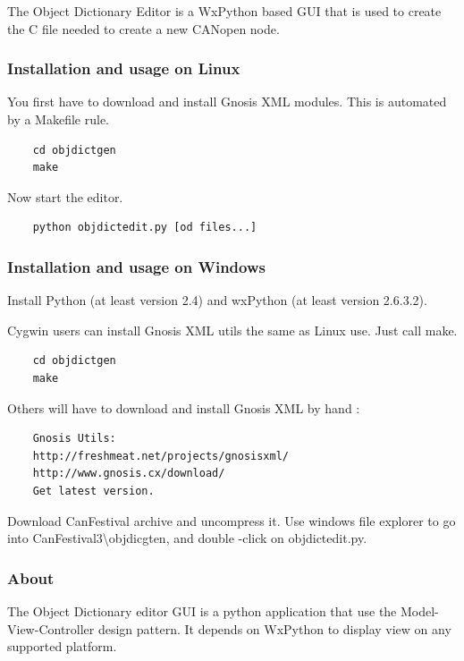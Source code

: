 \documentclass[12pt,english,a4paper]{book}
\newcommand{\canopen}{CANopen }
\begin{document}
The Object Dictionary Editor is a WxPython based GUI that is used
to create the C file needed to create a new \canopen node.


\subsubsection{Installation and usage on Linux}

You first have to download and install Gnosis XML modules. This is
automated by a Makefile rule.

\begin{verbatim}
	cd objdictgen 
	make
\end{verbatim}

Now start the editor.

\begin{verbatim}
	python objdictedit.py [od files...]
\end{verbatim}


\subsubsection{Installation and usage on Windows}

Install Python (at least version 2.4) and wxPython (at least version
2.6.3.2).

Cygwin users can install Gnosis XML utils the same as Linux use. Just
call make.

\begin{verbatim}
	cd objdictgen
	make
\end{verbatim}

Others will have to download and install Gnosis XML by hand :

\begin{verbatim}
	Gnosis Utils:
	http://freshmeat.net/projects/gnosisxml/
	http://www.gnosis.cx/download/
	Get latest version.
\end{verbatim}

Download CanFestival archive and uncompress it. Use windows file explorer
to go into CanFestival3\textbackslash{}objdicgten, and double -click
on objdictedit.py.

\subsubsection{About}

The Object Dictionary editor GUI is a python application that use
the Model-View-Controller design pattern. It depends on WxPython to
display view on any supported platform.
\end{document}
